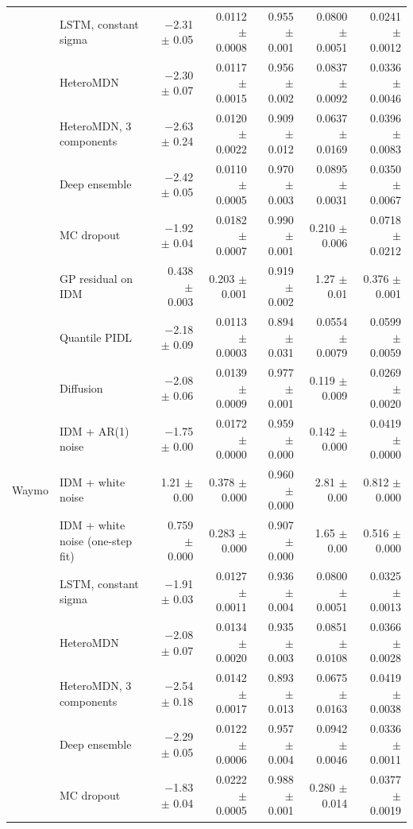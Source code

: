\begin{longtable}{llrrrrr}
 & LSTM, constant sigma & $-$2.31 $\pm$ 0.05 & 0.0112 $\pm$ 0.0008 & 0.955 $\pm$ 0.001 & 0.0800 $\pm$ 0.0051 & 0.0241 $\pm$ 0.0012 \\
 & HeteroMDN & $-$2.30 $\pm$ 0.07 & 0.0117 $\pm$ 0.0015 & 0.956 $\pm$ 0.002 & 0.0837 $\pm$ 0.0092 & 0.0336 $\pm$ 0.0046 \\
 & HeteroMDN, 3 components & $-$2.63 $\pm$ 0.24 & 0.0120 $\pm$ 0.0022 & 0.909 $\pm$ 0.012 & 0.0637 $\pm$ 0.0169 & 0.0396 $\pm$ 0.0083 \\
 & Deep ensemble & $-$2.42 $\pm$ 0.05 & 0.0110 $\pm$ 0.0005 & 0.970 $\pm$ 0.003 & 0.0895 $\pm$ 0.0031 & 0.0350 $\pm$ 0.0067 \\
 & MC dropout & $-$1.92 $\pm$ 0.04 & 0.0182 $\pm$ 0.0007 & 0.990 $\pm$ 0.001 & 0.210 $\pm$ 0.006 & 0.0718 $\pm$ 0.0212 \\
 & GP residual on IDM & 0.438 $\pm$ 0.003 & 0.203 $\pm$ 0.001 & 0.919 $\pm$ 0.002 & 1.27 $\pm$ 0.01 & 0.376 $\pm$ 0.001 \\
 & Quantile PIDL & $-$2.18 $\pm$ 0.09 & 0.0113 $\pm$ 0.0003 & 0.894 $\pm$ 0.031 & 0.0554 $\pm$ 0.0079 & 0.0599 $\pm$ 0.0059 \\
 & Diffusion & $-$2.08 $\pm$ 0.06 & 0.0139 $\pm$ 0.0009 & 0.977 $\pm$ 0.001 & 0.119 $\pm$ 0.009 & 0.0269 $\pm$ 0.0020 \\
 & IDM + AR(1) noise & $-$1.75 $\pm$ 0.00 & 0.0172 $\pm$ 0.0000 & 0.959 $\pm$ 0.000 & 0.142 $\pm$ 0.000 & 0.0419 $\pm$ 0.0000 \\
\midrule
Waymo & IDM + white noise & 1.21 $\pm$ 0.00 & 0.378 $\pm$ 0.000 & 0.960 $\pm$ 0.000 & 2.81 $\pm$ 0.00 & 0.812 $\pm$ 0.000 \\
 & IDM + white noise (one-step fit) & 0.759 $\pm$ 0.000 & 0.283 $\pm$ 0.000 & 0.907 $\pm$ 0.000 & 1.65 $\pm$ 0.00 & 0.516 $\pm$ 0.000 \\
 & LSTM, constant sigma & $-$1.91 $\pm$ 0.03 & 0.0127 $\pm$ 0.0011 & 0.936 $\pm$ 0.004 & 0.0800 $\pm$ 0.0051 & 0.0325 $\pm$ 0.0013 \\
 & HeteroMDN & $-$2.08 $\pm$ 0.07 & 0.0134 $\pm$ 0.0020 & 0.935 $\pm$ 0.003 & 0.0851 $\pm$ 0.0108 & 0.0366 $\pm$ 0.0028 \\
 & HeteroMDN, 3 components & $-$2.54 $\pm$ 0.18 & 0.0142 $\pm$ 0.0017 & 0.893 $\pm$ 0.013 & 0.0675 $\pm$ 0.0163 & 0.0419 $\pm$ 0.0038 \\
 & Deep ensemble & $-$2.29 $\pm$ 0.05 & 0.0122 $\pm$ 0.0006 & 0.957 $\pm$ 0.004 & 0.0942 $\pm$ 0.0046 & 0.0336 $\pm$ 0.0011 \\
 & MC dropout & $-$1.83 $\pm$ 0.04 & 0.0222 $\pm$ 0.0005 & 0.988 $\pm$ 0.001 & 0.280 $\pm$ 0.014 & 0.0377 $\pm$ 0.0019 \\

\end{longtable}
